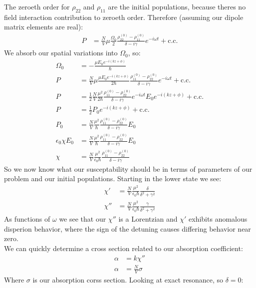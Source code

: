 The zeroeth order for $\rho_{22}$ and $\rho_{11}$ are the initial populations, because theres no field interaction contribution to zeroeth order. Therefore (assuming our dipole matrix elements are real):
\begin{align*}
	P &= \frac{N}{V}\mu \frac{\Omega_0}{2} \frac{\rho_{22}^{(0)} - \rho_{11}^{(0)}}{\delta - i\gamma} e^{-i\omega t} + \text{c.c.}
\end{align*}
We absorb our spatial variations into $\Omega_0$, so:
\begin{align*}
	\Omega_0 &= -\frac{\mu E_0 e^{-i(kz + \phi)}}{\hbar}\\
	P &= \frac{N}{V}\mu \frac{\mu E_0 e^{-i(kz + \phi)}}{2\hbar} \frac{\rho_{11}^{(0)} - \rho_{22}^{(0)}}{\delta - i\gamma} e^{-i\omega t} + \text{c.c.} \\
	P &= \frac{1}{2}\frac{N}{V}\frac{\mu^2 }{2\hbar} \frac{\rho_{11}^{(0)} - \rho_{22}^{(0)}}{\delta - i\gamma} e^{-i\omega t}E_0 e^{-i(kz + \phi)} + \text{c.c.} \\
	P &= \frac{1}{2}P_0 e^{-i(kz + \phi)} + \text{c.c.} \\
	P_0 &= \frac{N}{V} \frac{\mu^2}{\hbar}\frac{\rho_{11}^{(0)} - \rho_{22}^{(0)}}{\delta - i\gamma}E_0 \\
	\epsilon_0\chi E_0 &= \frac{N}{V} \frac{\mu^2}{\hbar}\frac{\rho_{11}^{(0)} - \rho_{22}^{(0)}}{\delta - i\gamma}E_0 \\
	\chi &= \frac{N}{V} \frac{\mu^2}{\epsilon_0\hbar}\frac{\rho_{11}^{(0)} - \rho_{22}^{(0)}}{\delta - i\gamma}
\end{align*}
So we now know what our susceptability should be in terms of parameters of our problem and our initial populations. Starting in the lower state we see:
\begin{align*}
	\chi' &= \frac{N}{V} \frac{\mu^2}{\epsilon_0\hbar}\frac{\delta}{\delta^2 + \gamma^2} \\
	\chi'' &= \frac{N}{V} \frac{\mu^2}{\epsilon_0\hbar}\frac{\gamma}{\delta^2 + \gamma^2}
\end{align*}
As functions of $\omega$ we see that our $\chi''$ is a Lorentzian and $\chi'$ exhibits anomalous disperion behavior, where the sign of the detuning causes differing behavior near zero. \\
We can quickly determine a cross section related to our absorption coefficient:
\begin{align*}
	\alpha &= k\chi'' \\
	\alpha &= \frac{N}{V}\sigma
\end{align*}
Where $\sigma$ is our absorption corss section. Looking at exact resonance, so $\delta = 0$:
